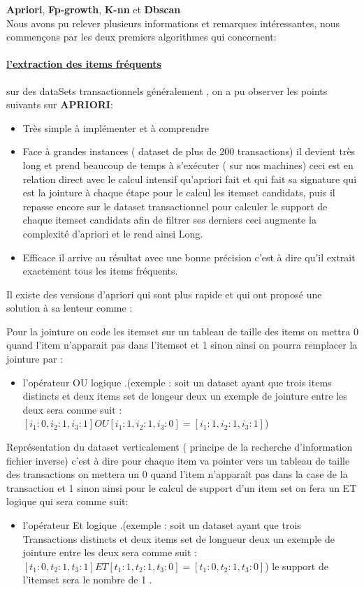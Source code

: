\documentclass[12pt,a4paper,oneside]{book}
\begin{document}
 \textbf{Apriori}, \textbf{Fp-growth}, \textbf{K-nn} et \textbf{Dbscan}\\
 
 Nous avons pu relever plusieurs informations et remarques intéressantes, nous commençons par les deux premiers algorithmes qui concernent:
 
 \paragraph{\underline{l'extraction des items fréquents}}
 sur des dataSets transactionnels généralement , on a pu observer les points suivants sur \textbf{APRIORI}:

\begin{itemize}
	\item Très simple à implémenter  et à comprendre 
	\item Face à grandes instances ( dataset de plus de 200 transactions) il devient très long et prend beaucoup de temps à s'exécuter ( sur nos machines) ceci est en relation direct avec le calcul intensif qu'apriori fait et qui fait sa signature qui est la jointure à chaque étape pour le calcul les itemset candidats, puis il repasse encore sur le dataset transactionnel pour calculer le support de chaque itemset candidats afin de filtrer ses derniers ceci augmente la complexité d'apriori et le rend ainsi Long.
	\item Efficace  il arrive au résultat avec une bonne précision c'est à dire qu'il extrait exactement tous les items fréquents. 
\end{itemize}

Il existe des versions d'apriori qui sont plus rapide et qui ont proposé une solution à sa lenteur comme :

 Pour la jointure on code les itemset sur un tableau de taille des items on mettra 0 quand l'item n'apparait pas dans l'itemset et 1 sinon ainsi on pourra remplacer la jointure par :
\begin{itemize}
	\item l'opérateur OU logique .(exemple : soit un dataset ayant que trois items distincts et deux items set de longeur deux un exemple de jointure entre les deux sera comme suit :$[i_{1}:0,i_{2}:1,i_{3}:1] OU [i_{1}:1,i_{2}:1,i_{3}:0] = [i_{1}:1,i_{2}:1,i_{3}:1]$)
\end{itemize}

Représentation du dataset verticalement ( principe de la recherche d'information fichier inverse)  c'est à dire pour chaque item va pointer vers un tableau de taille des transactions on mettera un 0 quand l'item n'apparaît pas dans la case de la transaction et 1  sinon ainsi pour le calcul de support d'un item set on fera un ET logique qui sera comme suit:
\begin{itemize}
	\item l'opérateur Et logique .(exemple : soit un dataset ayant que trois Transactions distincts et deux items set de longueur deux un exemple de jointure entre les deux sera comme suit :$[t_{1}:0,t_{2}:1,t_{3}:1] ET [t_{1}:1,t_{2}:1,t_{3}:0] = [t_{1}:0,t_{2}:1,t_{3}:0]$) le support de l'itemset sera le nombre de 1 .
\end{itemize}
\end{document}
